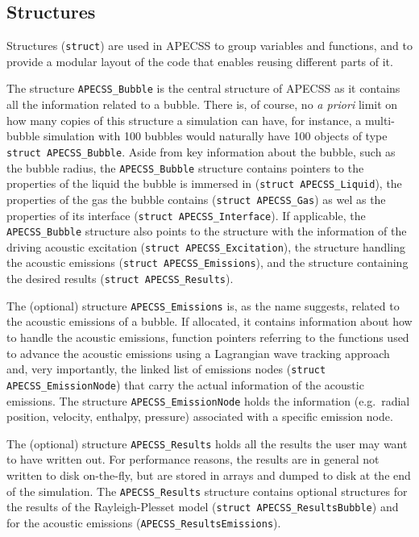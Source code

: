 \subsection{Structures}

Structures ({\tt struct}) are used in APECSS to group variables and functions, and to provide a modular layout of the code that enables reusing different parts of it.

The structure {\tt APECSS\_Bubble} is the central structure of APECSS as it contains all the information related to a bubble. There is, of course, no {\it a priori} limit on how many copies of this structure a simulation can have, for instance, a multi-bubble simulation with 100 bubbles would naturally have 100 objects of type {\tt struct APECSS\_Bubble}. Aside from key information about the bubble, such as the bubble radius, the {\tt APECSS\_Bubble} structure contains pointers to the properties of the liquid the bubble is immersed in ({\tt struct APECSS\_Liquid}), the properties of the gas the bubble contains ({\tt struct APECSS\_Gas}) as wel as the properties of its interface ({\tt struct APECSS\_Interface}). If applicable, the {\tt APECSS\_Bubble} structure also points to the structure with the information of the driving acoustic excitation ({\tt struct APECSS\_Excitation}), the structure handling the acoustic emissions ({\tt struct APECSS\_Emissions}), and the structure containing the desired results ({\tt struct APECSS\_Results}). 

The (optional) structure {\tt APECSS\_Emissions} is, as the name suggests, related to the acoustic emissions of a bubble. If allocated, it contains information about how to handle the acoustic emissions, function pointers referring to the functions used to advance the acoustic emissions using a Lagrangian wave tracking approach and, very importantly, the linked list of emissions nodes ({\tt struct APECSS\_EmissionNode}) that carry the actual information of the acoustic emissions. The structure {\tt APECSS\_EmissionNode}  holds the information (e.g.~radial position, velocity, enthalpy, pressure) associated with a specific emission node.

The (optional) structure {\tt APECSS\_Results} holds all the results the user may want to have written out. For performance reasons, the results are in general not written to disk on-the-fly, but are stored in arrays and dumped to disk at the end of the simulation. The {\tt APECSS\_Results} structure contains optional structures for the results of the Rayleigh-Plesset model ({\tt struct APECSS\_ResultsBubble}) and for the acoustic emissions ({\tt APECSS\_ResultsEmissions}).


